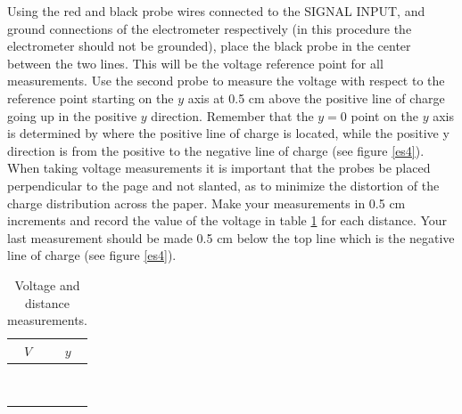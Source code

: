 {{\noindent Using the red and black probe wires connected to the SIGNAL
INPUT, and ground connections of the electrometer respectively (in this
procedure the electrometer should not be grounded), place
the black probe in the center between the two lines. This
will be the voltage reference point for all measurements. Use
the second probe to measure the voltage with
respect to the reference point starting on the $y$ axis at 0.5 cm
above the positive line of charge going up in the positive $y$
direction.  Remember that the $y=0$ point on the $y$ axis is determined by
where the positive line of charge is located, while the positive y direction
is from the positive to the negative line of charge (see figure \ref{es4}).
When taking voltage measurements it is important that the probes be placed
perpendicular to the page and not slanted, as to minimize the distortion of
the charge distribution across the paper.  Make your measurements in 0.5 cm
increments and record the value of the voltage in table \ref{tes1}
for each distance.  Your last measurement should be made 0.5 cm below the top
line which is the negative line of charge (see figure \ref{es4}). 

\begin{table}
\hspace{2cm}\begin{tabular}{|c|c|}\hline
\hspace{2cm} $V$ \hspace{2cm} & \hspace{2cm} $y$ \hspace{2cm} \\
\hline
\hspace{4cm} & \hspace{4cm} \\
\hline
\hspace{4cm} & \hspace{4cm} \\
\hline
\hspace{4cm} & \hspace{4cm} \\
\hline
\hspace{4cm} & \hspace{4cm} \\
\hline
\hspace{4cm} & \hspace{4cm} \\
\hline
\hspace{4cm} & \hspace{4cm} \\
\hline
\hspace{4cm} & \hspace{4cm} \\
\hline
\hspace{4cm} & \hspace{4cm} \\
\hline
\hspace{4cm} & \hspace{4cm} \\
\hline
\end{tabular}
\caption {Voltage and distance measurements.} \label{tes1}
\end{table}


}}
